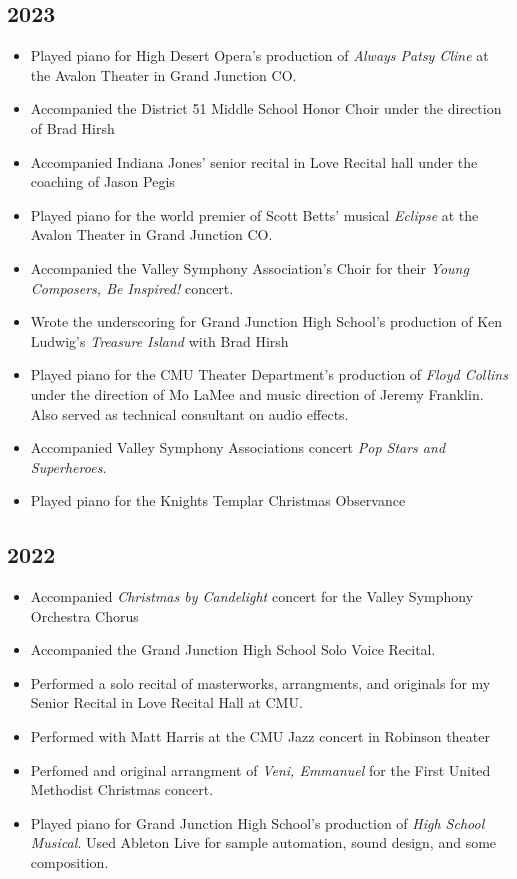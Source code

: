 \documentclass{article}
\newcommand{\cvItem}[1]{
        \item {
            {#1}
        }
    }
\newcommand{\cvItemListStart}{\begin{itemize}[leftmargin=10pt]}
\newcommand{\cvItemListEnd}{\end{itemize}}
\begin{document}
        \subsection{2023}
            \cvItemListStart
                \cvItem{Played piano for High Desert Opera's production of {\em Always Patsy Cline}
                at the Avalon Theater in Grand Junction CO.}
                \cvItem{Accompanied the District 51 Middle School Honor Choir under the direction of
                Brad Hirsh}
                \cvItem{Accompanied Indiana Jones' senior recital in Love Recital hall under the
                coaching of Jason Pegis}
                \cvItem{Played piano for the world premier of Scott Betts' musical {\em Eclipse} at
                the Avalon Theater in Grand Junction CO.}
                \cvItem{Accompanied the Valley Symphony Association's Choir for their {\em Young
                Composers, Be Inspired!} concert.}
                \cvItem{Wrote the underscoring for Grand Junction High School's production of Ken
                Ludwig's {\em Treasure Island} with Brad Hirsh}
                \cvItem{Played piano for the CMU Theater Department's production of {\em Floyd
                Collins} under the direction of Mo LaMee and music direction of Jeremy Franklin.
                Also served as technical consultant on audio effects.}
                \cvItem{Accompanied Valley Symphony Associations concert {\em Pop Stars and
                Superheroes.}}
                \cvItem{Played piano for the Knights Templar Christmas Observance}
            \cvItemListEnd
        \subsection{2022}
            \cvItemListStart
                \cvItem{Accompanied {\em Christmas by Candelight} concert for the Valley Symphony
                Orchestra Chorus}
                \cvItem{Accompanied the Grand Junction High School Solo Voice Recital.}
                \cvItem{Performed a solo recital of masterworks, arrangments, and originals for my
                Senior Recital in Love Recital Hall at CMU.}
                \cvItem{Performed with Matt Harris at the CMU Jazz concert in Robinson theater}
                \cvItem{Perfomed and original arrangment of {\em Veni, Emmanuel} for the First
                United Methodist Christmas concert.}
                \cvItem{Played piano for Grand Junction High School's production of {\em High School
                Musical}. Used Ableton Live for sample automation, sound design, and some
                composition.}
            \cvItemListEnd
\end{document}

